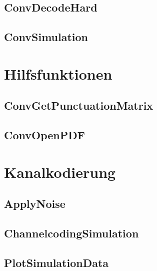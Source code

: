 \subsection{ConvDecodeHard}


\subsection{ConvSimulation}


\section{Hilfsfunktionen}
\label{kapitel:interface_hilfsfunktionen}

\subsection{ConvGetPunctuationMatrix}


\subsection{ConvOpenPDF}


\section{Kanalkodierung}
\label{kapitel:interface_kanalkodierung}

\subsection{ApplyNoise}


\subsection{ChannelcodingSimulation}


\subsection{PlotSimulationData}
